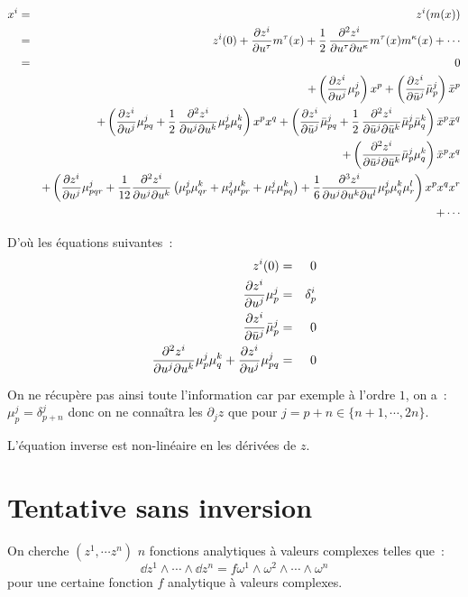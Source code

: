 \documentclass[a4paper,draft]{amsart}
\begin{document}
\begin{eqnarray*}
x^i &=& z^i(m(x))\\
    &=& z^i(0) + \dfrac{\partial{z^i}}{\partial{u^\tau}}m^\tau(x) + \operatorname{\frac{1}{2}}\dfrac{\partial^2 z^i}{\partial u^\tau \partial u^\kappa}m^\tau(x)m^\kappa(x) + \cdots\\
    &=& 0\\
    & & + \left(\dfrac{\partial{z^i}}{\partial{u^j}}\mu^j_p \right) x^p +  \left(\dfrac{\partial{z^i}}{\partial{\bar{u}^j}}\bar{\mu}^j_p \right) \bar{x}^p\\
    & & + \left(\dfrac{\partial{z^i}}{\partial{u^j}}\mu^j_{pq} + \operatorname{\frac{1}{2}}\dfrac{\partial^2 z^i}{\partial u^j \partial u^k}\mu^j_p \mu^k_q \right)x^p x^q 
+ \left(\dfrac{\partial{z^i}}{\partial{\bar{u}^j}}\bar{\mu}^j_{pq} + \operatorname{\frac{1}{2}}\dfrac{\partial^2 z^i}{\partial \bar{u}^j \partial \bar{u}^k}\bar{\mu}^j_p \bar{\mu}^k_q \right)\bar{x}^p \bar{x}^q\\
    & & \qquad + \left(\dfrac{\partial^2 z^i}{\partial \bar{u}^j \partial \bar{u}^k}\bar{\mu}^j_p \mu^k_q \right)\bar{x}^p x^q\\
    & & + \left(\dfrac{\partial{z^i}}{\partial{u^j}}\mu^j_{pqr} + \dfrac{1}{12}\dfrac{\partial^2 z^i}{\partial u^j \partial u^k}\left(\mu^j_p \mu^k_{qr} + \mu^j_q \mu^k_{pr} + \mu^j_r \mu^k_{pq}
    \right) + \dfrac{1}{6}\dfrac{\partial^3 z^i}{\partial u^j \partial u^k \partial u^l}\mu^j_p \mu^k_q \mu^l_r \right) x^p x^q x^r\\
    & & + \cdots
\end{eqnarray*}

D'où les équations suivantes~:
\begin{eqnarray*}
z^i(0) &=& 0\\
\dfrac{\partial{z^i}}{\partial{u^j}}\mu^j_p &=& \delta^i_p\\
\dfrac{\partial{z^i}}{\partial{\bar{u}^j}}\bar{\mu}^j_p &=& 0\\
\dfrac{\partial^2{z^i}}{\partial{u^j}\partial{u^k}}\mu^j_p\mu^k_q + \dfrac{\partial{z^i}}{\partial{u^j}}\mu^j_{pq} &=& 0
\end{eqnarray*}

On ne récupère pas ainsi toute l'information car par exemple à l'ordre $1$, on a~: $\mu_p^j = \delta_{p+n}^j$ donc on ne connaîtra les $\partial_j z$ que pour $j = p+n \in \{n+1,\cdots,2n\}$.

L'équation inverse est non-linéaire en les dérivées de $z$.
\section{Tentative sans inversion}
On cherche $(z^1,\cdots z^n)$ $n$ fonctions analytiques à valeurs complexes telles que~:
\[
\dd z^1 \wedge \cdots \wedge \dd z^n = f \omega^1 \wedge \omega^2 \wedge	\cdots \wedge \omega^n
\]
pour une certaine fonction $f$ analytique à valeurs complexes.
\end{document}
